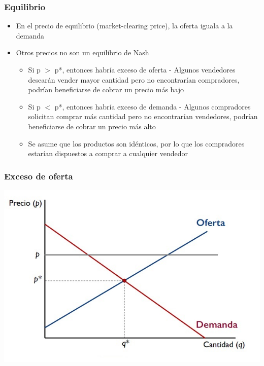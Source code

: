 \documentclass{beamer}
\begin{document}
\begin{frame}
\frametitle{Equilibrio}
\begin{itemize}
    \item En el precio de equilibrio (market-clearing price), la oferta iguala a la demanda
    \item Otros precios no son un equilibrio de Nash
    \begin{itemize}
        \item Si p $>$ p*, entonces habría exceso de oferta %
        - Algunos vendedores desearán vender mayor cantidad pero no encontrarían compradores, podrían beneficiarse de cobrar un precio más bajo
        \item Si p $<$ p*, entonces habría exceso de demanda %
        - Algunos compradores solicitan comprar más cantidad pero no encontrarían vendedores, podrían beneficiarse de cobrar un precio más alto
        \item Se asume que los productos son idénticos, por lo que los compradores estarían dispuestos a comprar a cualquier vendedor
    \end{itemize}
\end{itemize}
\end{frame}

\begin{frame}
\frametitle{Exceso de oferta}
\includegraphics[scale=0.6]{Slides Principios de Economia/Figures/Tema_07.3_equilibrioofertademanda_0excesodeoferta.jpg}
\end{frame}
\end{document}
